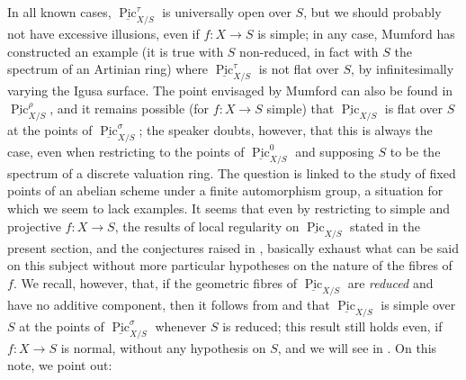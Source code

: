 \begin{remark}\label{fga3.vi-2-remark-2.9}
    In all known cases, $\underline{\operatorname{Pic}}_{X/S}^\tau$ is universally open over $S$, but we should probably not have excessive illusions, even if $f\colon X\to S$ is simple;
    in any case, Mumford has constructed an example (it is true with $S$ non-reduced, in fact with $S$ the spectrum of an Artinian ring) where $\underline{\operatorname{Pic}}_{X/S}^\tau$ is not flat over $S$, by infinitesimally varying the Igusa surface.
    The point envisaged by Mumford can also be found in $\underline{\operatorname{Pic}}_{X/S}^\rho$, and it remains possible (for $f\colon X\to S$ simple) that $\underline{\operatorname{Pic}}_{X/S}$ is flat over $S$ at the points of $\underline{\operatorname{Pic}}_{X/S}^\sigma$;
    the speaker doubts, however, that this is always the case, even when restricting to the points of $\underline{\operatorname{Pic}}_{X/S}^0$ and supposing $S$ to be the spectrum of a discrete valuation ring.
    The question is linked to the study of fixed points of an abelian scheme under a finite automorphism group, a situation for which we seem to lack examples.
    It seems that even by restricting to simple and projective $f\colon X\to S$, the results of local regularity on $\underline{\operatorname{Pic}}_{X/S}$ stated in the present section, and the conjectures raised in , basically exhaust what can be said on this subject without more particular hypotheses on the nature of the fibres of $f$.
    We recall, however, that, if the geometric fibres of $\underline{\operatorname{Pic}}_{X/S}$ are \emph{reduced} and have no additive component, then it follows from  and  that $\underline{\operatorname{Pic}}_{X/S}$ is simple over $S$ at the points of $\underline{\operatorname{Pic}}_{X/S}^\sigma$ whenever $S$ is reduced;
    this result still holds even, if $f\colon X\to S$ is normal, without any hypothesis on $S$, and we will see in .
    On this note, we point out:
\end{remark}

